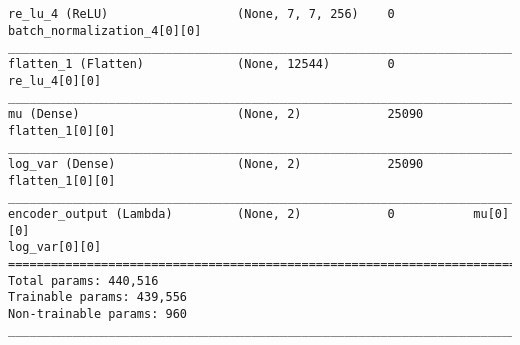 \begin{lstlisting}[caption={\textsc{Mnist}-VAE Encoder},captionpos=b,basicstyle=\tiny, label={lst:mnist-vae-encoder}]
re_lu_4 (ReLU)                  (None, 7, 7, 256)    0           batch_normalization_4[0][0]
__________________________________________________________________________________________________
flatten_1 (Flatten)             (None, 12544)        0           re_lu_4[0][0]
__________________________________________________________________________________________________
mu (Dense)                      (None, 2)            25090       flatten_1[0][0]
__________________________________________________________________________________________________
log_var (Dense)                 (None, 2)            25090       flatten_1[0][0]
__________________________________________________________________________________________________
encoder_output (Lambda)         (None, 2)            0           mu[0][0]
log_var[0][0]
==================================================================================================
Total params: 440,516
Trainable params: 439,556
Non-trainable params: 960
__________________________________________________________________________________________________
\end{lstlisting}